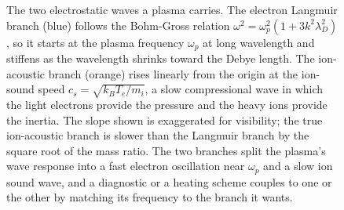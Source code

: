 \begin{figure}[htbp]
\centering
{}
\caption[Electrostatic wave branches]{The two electrostatic waves a plasma
carries. The electron Langmuir branch (blue) follows the Bohm-Gross relation
$\omega^{2}=\omega_p^{2}(1+3k^{2}\lambda_D^{2})$, so it starts at the plasma
frequency $\omega_p$ at long wavelength and stiffens as the wavelength shrinks
toward the Debye length. The ion-acoustic branch (orange) rises linearly from
the origin at the ion-sound speed $c_s=\sqrt{k_B T_e/m_i}$, a slow
compressional wave in which the light electrons provide the pressure and the
heavy ions provide the inertia. The slope shown is exaggerated for visibility;
the true ion-acoustic branch is slower than the Langmuir branch by the square
root of the mass ratio. The two branches split the plasma's wave response into
a fast electron oscillation near $\omega_p$ and a slow ion sound wave, and a
diagnostic or a heating scheme couples to one or the other by matching its
frequency to the branch it wants.}
\label{fig:vol04ch13:wave-dispersion}
\end{figure}

